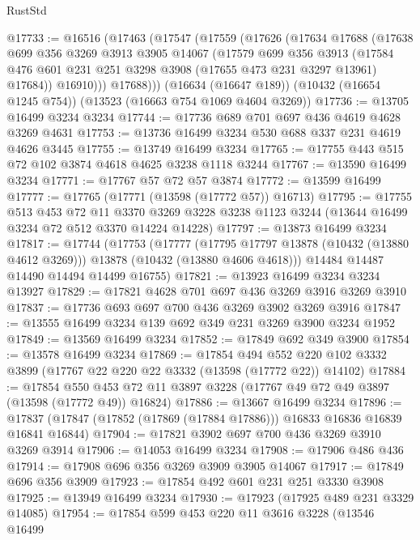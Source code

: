 \begin{lexlean}{RustStd}
\begin{coremodule}
@17733 := @16516
    (@17463
      (@17547
        (@17559
          (@17626
            (@17634
              @17688
              (@17638
                @699
                @356
                @3269
                @3913
                @3905
                @14067
                (@17579
                  @699
                  @356
                  @3913
                  (@17584 @476 @601 @231 @251 @3298 @3908 (@17655 @473 @231 @3297 @13961) @17684))
                @16910)))
          @17688)))
    (@16634 (@16647 @189))
    (@10432 (@16654 @1245 @754))
    (@13523 (@16663 @754 @1069 @4604 @3269))
@17736 := @13705 @16499 @3234 @3234
@17744 := @17736 @689 @701 @697 @436 @4619 @4628 @3269 @4631
@17753 := @13736 @16499 @3234 @530 @688 @337 @231 @4619 @4626 @3445
@17755 := @13749 @16499 @3234
@17765 := @17755 @443 @515 @72 @102 @3874 @4618 @4625 @3238 @1118 @3244
@17767 := @13590 @16499 @3234
@17771 := @17767 @57 @72 @57 @3874
@17772 := @13599 @16499
@17777 := @17765 (@17771 (@13598 (@17772 @57)) @16713)
@17795 := @17755
    @513
    @453
    @72
    @11
    @3370
    @3269
    @3228
    @3238
    @1123
    @3244
    (@13644 @16499 @3234 @72 @512 @3370 @14224 @14228)
@17797 := @13873 @16499 @3234
@17817 := @17744
    (@17753
      (@17777
        (@17795 @17797 @13878 (@10432 (@13880 @4612 @3269)))
        @13878
        (@10432 (@13880 @4606 @4618)))
      @14484
      @14487
      @14490
      @14494
      @14499
      @16755)
@17821 := @13923 @16499 @3234 @3234 @13927
@17829 := @17821 @4628 @701 @697 @436 @3269 @3916 @3269 @3910
@17837 := @17736 @693 @697 @700 @436 @3269 @3902 @3269 @3916
@17847 := @13555 @16499 @3234 @139 @692 @349 @231 @3269 @3900 @3234 @1952
@17849 := @13569 @16499 @3234
@17852 := @17849 @692 @349 @3900
@17854 := @13578 @16499 @3234
@17869 := @17854
    @494
    @552
    @220
    @102
    @3332
    @3899
    (@17767 @22 @220 @22 @3332 (@13598 (@17772 @22)) @14102)
@17884 := @17854
    @550
    @453
    @72
    @11
    @3897
    @3228
    (@17767 @49 @72 @49 @3897 (@13598 (@17772 @49)) @16824)
@17886 := @13667 @16499 @3234
@17896 := @17837 (@17847 (@17852 (@17869 (@17884 @17886))) @16833 @16836 @16839 @16841 @16844)
@17904 := @17821 @3902 @697 @700 @436 @3269 @3910 @3269 @3914
@17906 := @14053 @16499 @3234
@17908 := @17906 @486 @436
@17914 := @17908 @696 @356 @3269 @3909 @3905 @14067
@17917 := @17849 @696 @356 @3909
@17923 := @17854 @492 @601 @231 @251 @3330 @3908
@17925 := @13949 @16499 @3234
@17930 := @17923 (@17925 @489 @231 @3329 @14085)
@17954 := @17854
    @599
    @453
    @220
    @11
    @3616
    @3228
    (@13546
      @16499

\end{coremodule}
\end{lexlean}
